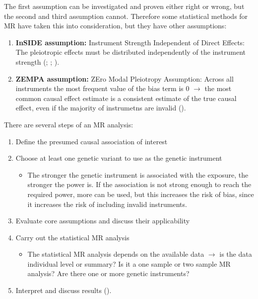 \documentclass[
]{article}
\providecommand{\tightlist}{%
  \setlength{\itemsep}{0pt}\setlength{\parskip}{0pt}}
\begin{document}
The first assumption can be investigated and proven either right or
wrong, but the second and third assumption cannot. Therefore some
statistical methods for MR have taken this into consideration, but they
have other assumptions:

\begin{enumerate}
\def\labelenumi{\arabic{enumi}.}
\setcounter{enumi}{3}
\tightlist
\item
  \textbf{InSIDE assumption:} Instrument Strength Independent of Direct
  Effects: The pleiotropic effects must be distributed independently of
  the instrument strength (; ;
  ).
\item
  \textbf{ZEMPA assumption:} ZEro Modal Pleiotropy Assumption: Across
  all instruments the most frequent value of the bias term is 0 \(\to\)
  the most common causal effect estimate is a consistent estimate of the
  true causal effect, even if the majority of instrumetns are invalid
  ().
\end{enumerate}

There are several steps of an MR analysis:

\begin{enumerate}
\def\labelenumi{\arabic{enumi}.}
\tightlist
\item
  Define the presumed causal association of interest
\item
  Choose at least one genetic variant to use as the genetic instrument

  \begin{itemize}
  \tightlist
  \item
    The stronger the genetic instrument is associated with the exposure,
    the stronger the power is. If the association is not strong enough
    to reach the required power, more can be used, but this increases
    the risk of bias, since it increases the risk of including invalid
    instruments.
  \end{itemize}
\item
  Evaluate core assumptions and discuss their applicability
\item
  Carry out the statistical MR analysis

  \begin{itemize}
  \tightlist
  \item
    The statistical MR analysis depends on the available data \(\to\) is
    the data individual level or summary? Is it a one sample or two
    sample MR analysis? Are there one or more genetic instruments?
  \end{itemize}
\item
  Interpret and discuss results ().
\end{enumerate}
\end{document}
